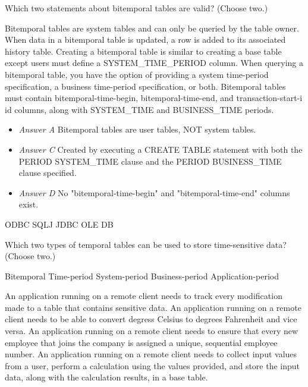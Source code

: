 \documentclass[answers, 11pt]{exam}
\begin{document}
\begin{questions}
\question[1]
Which two statements about bitemporal tables are valid? (Choose two.)
\begin{choices}
	\choice Bitemporal tables are system tables and can only be queried by the table owner.
	\CorrectChoice When data in a bitemporal table is updated, a row is added to its associated history table.
	\choice Creating a bitemporal table is similar to creating a base table except users must define a 
	SYSTEM\_TIME\_PERIOD column.
	\CorrectChoice When querying a bitemporal table, you have the option of providing a system time-period 
	specification, a business time-period specification, or both.
	\choice Bitemporal tables must contain bitemporal-time-begin, bitemporal-time-end, and transaction-start-i
	id columns, along with SYSTEM\_TIME and BUSINESS\_TIME periods.
\end{choices}

\begin{solution}
	\begin{itemize}
		\item \textit{Answer A} Bitemporal tables are user tables, NOT system tables.
		\item \textit{Answer C} Created by executing a CREATE TABLE statement with both the PERIOD SYSTEM\_TIME clause and the PERIOD BUSINESS\_TIME clause specified.
		\item \textit{Answer D} No "bitemporal-time-begin" and "bitemporal-time-end" columns exist.
	\end{itemize}
\end{solution}

\begin{choices}
	\choice ODBC
	\choice SQLJ
	\CorrectChoice JDBC
	\choice OLE DB
\end{choices}

\question[1]
Which two types of temporal tables can be used to store time-sensitive data? (Choose two.)
\begin{choices}
	\CorrectChoice Bitemporal
	\choice Time-period
	\choice System-period
	\choice Business-period
	\CorrectChoice Application-period
\end{choices}

\newpage
{}
\begin{choices}
	\choice An application running on a remote client needs to track every modification made to a 
	table that contains sensitive data.
	\choice An application running on a remote client needs to be able to convert degress Celsius to degrees
	Fahrenheit and vice versa.
	\choice An application running on a remote client needs to ensure that every new employee that joins the 
	company is assigned a unique, sequential employee number.
	\CorrectChoice An application running on a remote client needs to collect input values from a user, 
	perform a calculation using the values provided, and store the input data, along with the calculation
	results, in a base table.
\end{choices}


\end{questions}
\end{document}
